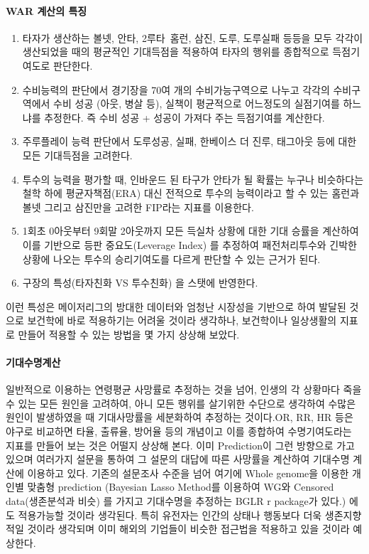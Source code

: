\documentclass[11pt]{article}
\begin{document}
\paragraph{WAR 계산의 특징}
\begin{enumerate}
  \item 타자가 생산하는 볼넷, 안타, 2루타~홈런, 삼진, 도루, 도루실패 등등을 모두 각각이 
생산되었을 때의 평균적인 기대득점을 적용하여 타자의 행위를 종합적으로 득점기여도로 판단한다. 
  \item 수비능력의 판단에서 경기장을 70여 개의 수비가능구역으로 나누고 각각의 수비구역에서 수비 성공 (아웃, 병살 등), 실책이 평균적으로 어느정도의 실점기여를 하느냐를 추정한다. 즉 수비 성공 + 성공이 가져다 주는 득점기여를 계산한다. 
  \item 주루플레이 능력 판단에서  도루성공, 실패, 한베이스 더 진루, 태그아웃 등에 대한 모든 기대득점을 고려한다.
  \item 투수의 능력을 평가할 때, 인바운드 된 타구가 안타가 될 확률는 누구나 비슷하다는 철학 하에 평균자책점(ERA) 대신 전적으로 투수의 능력이라고 할 수 있는 홈런과 볼넷 그리고 삼진만을 고려한 FIP라는 지표를 이용한다. 
  \item 1회초 0아웃부터 9회말 2아웃까지 모든 득실차 상황에 대한 기대 승률을 계산하여 이를 기반으로 등판 중요도(Leverage Index) 를 추정하여 패전처리투수와 긴박한 상황에 나오는 투수의 승리기여도를 다르게 판단할 수 있는 근거가 된다.
  \item 구장의 특성(타자친화 VS 투수친화) 을 스탯에 반영한다. 
\end{enumerate}

이런 특성은 메이저리그의 방대한 데이터와 엄청난 시장성을 기반으로 하여 발달된 것으로 보건학에 바로 적용하기는 어려울 것이라 생각하나, 보건학이나 일상생활의 지표로 만들어 적용할 수 있는 방법을 몇 가지 상상해 보았다. 
\paragraph{기대수명계산}
일반적으로 이용하는 연령평균 사망률로 추정하는 것을 넘어, 인생의 각 상황마다 죽을 수 있는 모든 원인을 고려하여, 아니 모든 행위를 살기위한 수단으로 생각하여  수많은 원인이 발생하였을 때 기대사망률을 세분화하여 추정하는 것이다.OR, RR, HR 등은 야구로 비교하면 타율, 출류율, 방어율 등의 개념이고 이를 종합하여 수명기여도라는 지표를 만들어 보는 것은 어떨지 상상해 본다. 이미 Prediction이 그런 방향으로 가고 있으며 여러가지 설문을 통하여 그 설문의 대답에 따른 사망률을 계산하여 기대수명 계산에 이용하고 있다\cite{life_upen}.   
 기존의 설문조사 수준을 넘어 여기에 Whole genome을 이용한 개인별 맞춤형 prediction (Bayesian Lasso Method를 이용하여 WG와 Censored data(생존분석과 비슷) 를 가지고 기대수명을 추정하는 BGLR r package가 있다.) 에도 적용가능할 것이라 생각된다\cite{de2012prediction,camposbglr}. 특히 유전자는 인간의 상태나 행동보다 더욱 생존지향적일 것이라 생각되며 이미 해외의 기업들이 비슷한 접근법을 적용하고 있을 것이라 예상한다.  
 
\end{document}
